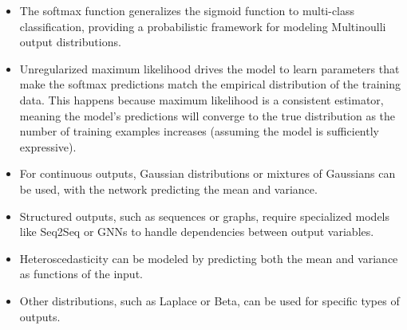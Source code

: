 \begin{notechapter}
\begin{itemize}
    \item The softmax function generalizes the sigmoid function to multi-class classification, providing a probabilistic framework for modeling Multinoulli output distributions.
    \item Unregularized maximum likelihood drives the model to learn parameters that make the softmax predictions match the empirical distribution of the training data. This happens because maximum likelihood is a consistent estimator, meaning the model's predictions will converge to the true distribution as the number of training examples increases (assuming the model is sufficiently expressive).
    \item For continuous outputs, Gaussian distributions or mixtures of Gaussians can be used, with the network predicting the mean and variance.
    \item Structured outputs, such as sequences or graphs, require specialized models like Seq2Seq or GNNs to handle dependencies between output variables.
    \item Heteroscedasticity can be modeled by predicting both the mean and variance as functions of the input.
    \item Other distributions, such as Laplace or Beta, can be used for specific types of outputs.
\end{itemize}
\end{notechapter}
